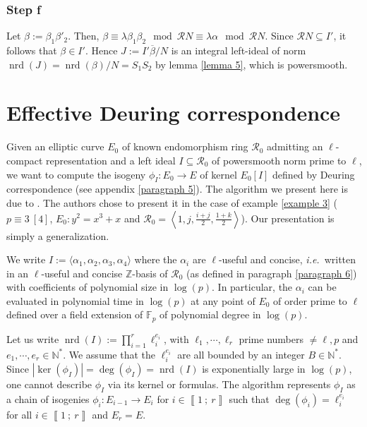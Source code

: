\documentclass[a4paper,10pt]{report}
\theoremstyle{definition}
\theoremstyle{plain}
\theoremstyle{definition}
\newcommand{\ie}{\emph{i.e.}\ }
\newcommand{\N}{\mathbb{N}}
\newcommand{\Z}{\mathbb{Z}}
\newcommand{\F}{\mathbb{F}}
\newcommand{\m}[1]{\mathcal{#1}}
\renewcommand{\i}[2]{\left\llbracket #1~;~#2\right\rrbracket}
\renewcommand{\(}{\left(}
\renewcommand{\)}{\right)}
\DeclareMathOperator{\nrd}{nrd}
\begin{document}
\subsubsection{Step f}

Let $\beta:=\beta_1\beta'_2$. Then, $\beta\equiv \lambda\beta_1\beta_2 \mod \m{R}N\equiv \lambda\alpha \mod \m{R}N$. Since $\m{R}N\subseteq I'$, it follows that $\beta\in I'$. Hence $J:=I'\overline{\beta}/N$ is an integral left-ideal of norm $\nrd(J)=\nrd(\beta)/N=S_1S_2$ by lemma \ref{lemma 5}, which is powersmooth. 

\section{Effective Deuring correspondence}\label{paragraph 4}

Given an elliptic curve $E_0$ of known endomorphism ring $\m{R}_0$ admitting an $\ell$-compact representation and a left ideal $I\subseteq \m{R}_0$ of powersmooth norm prime to $\ell$, we want to compute the isogeny $\phi_I : E_0\longrightarrow E$ of kernel $E_0[I]$ defined by Deuring correspondence (see appendix \ref{paragraph 5}). The algorithm we present here is due to \cite{Galbraith2016}. The authors chose to present it in the case of example \ref{example 3} ($p\equiv 3 \ [4]$, $E_0:y^2=x^3+x$ and $\m{R}_0=\left \langle 1, j,\frac{i+j}{2},\frac{1+k}{2}\right\rangle$). Our presentation is simply a generalization.

We write $I:=\langle\alpha_1,\alpha_2,\alpha_3,\alpha_4\rangle$ where the $\alpha_i$ are $\ell$-useful and concise, \ie written in an $\ell$-useful and concise $\Z$-basis of $\m{R}_0$ (as defined in paragraph \ref{paragraph 6}) with coefficients of polynomial size in $\log(p)$.  In particular, the $\alpha_i$ can be evaluated in polynomial time in $\log(p)$ at any point of $E_0$ of order prime to $\ell$ defined over a field extension of $\F_p$ of polynomial degree in $\log(p)$.  

Let us write $\nrd(I):=\prod_{i=1}^r \ell_i^{e_i}$, with $\ell_1, \cdots,\ell_r$ prime numbers $\neq \ell, p$ and $e_1,\cdots, e_r\in\N^*$. We assume that the $\ell_i^{e_i}$ are all bounded by an integer $B\in\N^*$.  Since $|\ker(\phi_I)|=\deg(\phi_I)=\nrd(I)$ is exponentially large in $\log(p)$, one cannot describe $\phi_I$ via its kernel or formulas. The algorithm represents $\phi_I$ as a chain of isogenies $\phi_i : E_{i-1}\longrightarrow E_{i}$ for $i\in\i{1}{r}$ such that $\deg(\phi_i)=\ell_i^{e_i}$ for all $i\in\i{1}{r}$ and $E_r=E$. 
\end{document}
